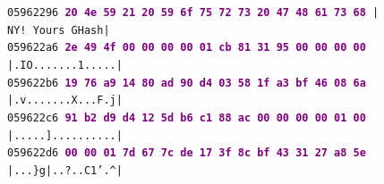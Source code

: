 \documentclass{article}
\begin{document}
\begin{figure}[H]
{    \texttt{05962296  \textbf{\textcolor{purple}{20 4e 59 21 20 59 6f 75  72 73 20 47 48 61 73 68}}  | NY! Yours GHash|} \\
    \texttt{059622a6  \textbf{\textcolor{purple}{2e 49 4f 00 00 00 00 01  cb 81 31 95 00 00 00 00}}  |.IO.......1.....|} \\
    \texttt{059622b6  \textbf{\textcolor{purple}{19 76 a9 14 80 ad 90 d4  03 58 1f a3 bf 46 08 6a}}  |.v.......X...F.j|} \\
    \texttt{059622c6  \textbf{\textcolor{purple}{91 b2 d9 d4 12 5d b6 c1  88 ac 00 00 00 00 01 00}}  |.....]..........|} \\
    \texttt{059622d6  \textbf{\textcolor{purple}{00 00 01 7d 67 7c de 17  3f 8c bf 43 31 27 a8 5e}}  |...\}g|..?..C1'.\textasciicircum|}
    }
    \end{figure}
\end{document}
